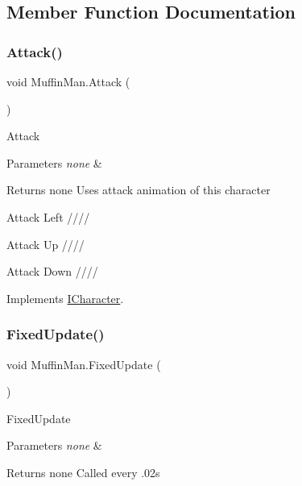 \subsection{Member Function Documentation}
\mbox{\label{class_muffin_man_af917e1ad1d45ee23bd6b7edc5d14e0c5}} 
\subsubsection{\texorpdfstring{Attack()}{Attack()}}
{\footnotesize\ttfamily void Muffin\+Man.\+Attack (\begin{DoxyParamCaption}{ }\end{DoxyParamCaption})\hspace{0.3cm}{\ttfamily [inline]}}

Attack 
\begin{DoxyParams}{Parameters}
{\em none} & \\
\hline
\end{DoxyParams}
\begin{DoxyReturn}{Returns}
none Uses attack animation of this character 
\end{DoxyReturn}
Attack Left ////

Attack Up ////

Attack Down //// 

Implements \mbox{\hyperlink{interface_i_character}{I\+Character}}.

\mbox{\label{class_muffin_man_a4b71be125a1beefd38dffd5a35ac8526}} 
\subsubsection{\texorpdfstring{Fixed\+Update()}{FixedUpdate()}}
{\footnotesize\ttfamily void Muffin\+Man.\+Fixed\+Update (\begin{DoxyParamCaption}{ }\end{DoxyParamCaption})\hspace{0.3cm}{\ttfamily [inline]}}

Fixed\+Update 
\begin{DoxyParams}{Parameters}
{\em none} & \\
\hline
\end{DoxyParams}
\begin{DoxyReturn}{Returns}
none Called every .02s 
\end{DoxyReturn}
\mbox{\label{class_muffin_man_a0b2cb2eb97c7452da51f40af91c7b4b3}} 
